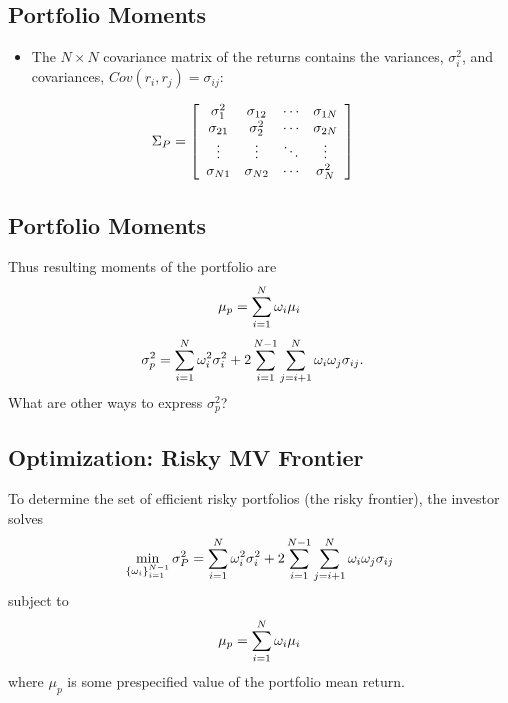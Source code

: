 \documentclass[letterpaper,10pt,english]{sphinxmanual}
\begin{document}
\subsection{Portfolio Moments}
\label{multiAssetOpt:id1}\begin{itemize}
\item {} 
The $N \times N$ covariance matrix of the returns contains the
variances, $\sigma^2_i$, and covariances, $Cov(r_i,
r_j) = \sigma_{ij}$:

\end{itemize}
\begin{gather}
\begin{split}\Sigma_P & = \left[\begin{array}{cccc} \sigma^2_1 &
\sigma_{12} & \cdots & \sigma_{1N} \\ \sigma_{21} &
\sigma^2_2 & \cdots & \sigma_{2N} \\ \vdots & \vdots &
\ddots & \vdots \\ \sigma_{N1} & \sigma_{N2} & \cdots &
\sigma^2_N \end{array}\right]\end{split}\notag
\end{gather}

\subsection{Portfolio Moments}
\label{multiAssetOpt:id2}
Thus resulting moments of the portfolio are
\begin{gather}
\begin{split}\mu_p & = \sum_{i=1}^N \omega_i \mu_i \\\end{split}\notag
\end{gather}\begin{gather}
\begin{split}\sigma^2_p & = \sum_{i=1}^N \omega^2_i \sigma^2_i +
2 \sum_{i=1}^{N-1} \sum_{j=i+1}^N \omega_i \omega_j \sigma_{ij}.\end{split}\notag
\end{gather}
What are other ways to express $\sigma^2_p$?


\subsection{Optimization: Risky MV Frontier}
\label{multiAssetOpt:optimization-risky-mv-frontier}
To determine the set of efficient risky portfolios (the risky
frontier), the investor solves
\begin{gather}
\begin{split}\min_{\{\omega_i\}_{i=1}^{N-1}} \sigma^2_P =
\sum_{i=1}^N \omega^2_i \sigma^2_i + 2 \sum_{i=1}^{N-1}
\sum_{j=i+1}^N \omega_i \omega_j \sigma_{ij}\end{split}\notag
\end{gather}
subject to
\begin{gather}
\begin{split}\mu_p = \sum_{i=1}^N \omega_i \mu_i\end{split}\notag
\end{gather}
where $\mu_p$ is some prespecified value of the portfolio mean
return.
\end{document}
